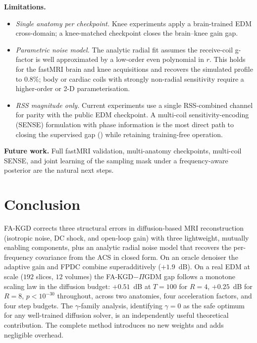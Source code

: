 \documentclass[conference]{IEEEtran}
\begin{document}
\textbf{Limitations.}
\begin{itemize}
  \item \textit{Single anatomy per checkpoint.} Knee experiments apply a
  brain-trained EDM cross-domain; a knee-matched checkpoint closes the
  brain--knee gain gap.
  \item \textit{Parametric noise model.} The analytic radial fit
   assumes the receive-coil g-factor is well
  approximated by a low-order even polynomial in $r$. This holds for the
  fastMRI brain and knee acquisitions and recovers the simulated profile
  to $0.8\%$; body or cardiac coils with strongly non-radial sensitivity
  require a higher-order or 2-D parameterisation.
  \item \textit{RSS magnitude only.} Current experiments use a single
  RSS-combined channel for parity with the public EDM checkpoint. A
  multi-coil sensitivity-encoding (SENSE) formulation with phase
  information is the most direct path to closing the supervised gap
  () while retaining training-free operation.
\end{itemize}

\textbf{Future work.} Full fastMRI validation, multi-anatomy checkpoints,
multi-coil SENSE, and joint learning of the sampling mask under a
frequency-aware posterior are the natural next steps.

\section{Conclusion}
\label{sec:conclusion}

FA-KGD corrects three structural errors in diffusion-based MRI
reconstruction (isotropic noise, DC shock, and open-loop gain) with
three lightweight, mutually enabling components, plus an analytic radial
noise model that recovers the per-frequency covariance from the ACS in
closed form. On an oracle denoiser the adaptive gain and FPDC combine
superadditively ($+1.9$~dB). On a real EDM at scale ($192$ slices, $12$
volumes) the FA-KGD$-\Pi$GDM gap follows a monotone scaling law in the
diffusion budget: $+0.51$~dB at $T{=}100$ for $R{=}4$, $+0.25$~dB for
$R{=}8$, $p\!<\!10^{-30}$ throughout, across two anatomies, four
acceleration factors, and four step budgets. The $\gamma$-family
analysis, identifying $\gamma{=}0$ as the safe optimum for any
well-trained diffusion solver, is an independently useful theoretical
contribution. The complete method introduces no new weights and adds
negligible overhead.
\end{document}

